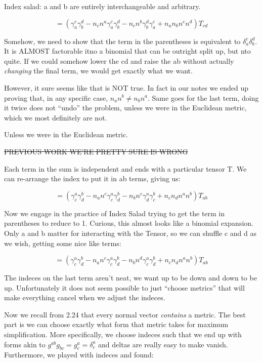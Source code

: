 \documentclass[landscape,letterpaper,10pt,english]{article}
\begin{document}
    Index salad: a and b are entirely interchangeable and arbitrary.

\[ = \left( \gamma^c_a\gamma^d_b - n_cn^a \gamma^c_a \gamma^d_b - n_cn^b \gamma^d_b \gamma^c_a + n_an_bn^cn^d \right) T_{cd} \]

Somehow, we need to show that the term in the parentheses is equivalent
to \(\delta^c_a\delta^d_b\). It is ALMOST factorable itno a binomial
that can be outright split up, but nto quite. If we could somehow lower
the cd and raise the ab without actually \emph{changing} the final term,
we would get exactly what we want.

However, it sure seems like that is NOT true. In fact in our notes we
ended up proving that, in any specific case, \(n_an^b \neq n_bn^a\).
Same goes for the last term, doing it twice does not ``undo'' the
problem, unless we were in the Euclidean metric, which we most
definitely are not.

    Unless we were in the Euclidean metric.

    \sout{PREVIOUS WORK WE'RE PRETTY SURE IS WRONG}

    Each term in the sum is independent and ends with a particular tensor T.
We can re-arrange the index to put it in ab terms, giving us:

\[ = (\gamma^a_c\gamma^b_d - n_an^c \gamma^a_c \gamma^b_d - n_bn^c \gamma^a_d \gamma^b_c + n_cn_dn^an^b)T_{ab} \]

Now we engage in the practice of Index Salad trying to get the term in
parentheses to reduce to 1. Curious, this almost looks like a binomial
expansion. Only a and b matter for interacting with the Tensor, so we
can shuffle c and d as we wish, getting some nice like terms:

\[ = (\gamma^a_c\gamma^b_d - n_an^c \gamma^a_c \gamma^b_d - n_bn^d \gamma^a_c \gamma^b_d + n_cn_dn^an^b)T_{ab} \]

The indeces on the last term aren't neat, we want up to be down and down
to be up. Unfortunately it does not seem possible to just ``choose
metrics'' that will make everything cancel when we adjust the indeces.

Now we recall from 2.24 that every normal vector \emph{contains} a
metric. The best part is we can choose exactly what form that metric
takes for maximum simplification. More specifically, we choose indeces
such that we end up with forms akin to
\(g^{ab} g_{bc} = g^a_c = \delta^a_c\) and deltas are really easy to
make vanish. Furthermore, we played with indeces and found:
\end{document}
